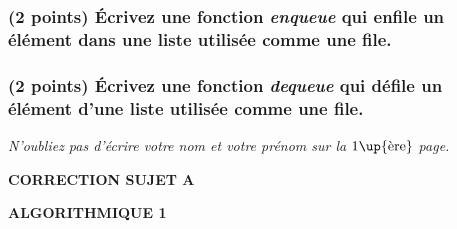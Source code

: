 \documentclass[11pt,a4paper]{article}
\newcommand{\TitreMatiere}{Algorithmique 1}
\begin{document}
\medskip

\subsubsection{(2 points) \'Ecrivez une fonction \og \textit{enqueue} \fg{} qui enfile un élément dans une liste utilisée comme une file. }

\begin{center}
\end{center}


\subsubsection{(2 points) \'Ecrivez une fonction \og \textit{dequeue} \fg{} qui défile un élément d'une liste utilisée comme une file. }

\begin{center}
\end{center}



\vfillFirst

\begin{center}
\textit{N'oubliez pas d'écrire votre nom et votre prénom sur la $1\up{\text{ère}}$ page.}
\end{center}

\vfillLast


\clearpage



\vfillFirst

\begin{center}

\begin{LARGE}
\textbf{CORRECTION SUJET A}

\bigskip

\textbf{\MakeUppercase{\TitreMatiere}}
\end{LARGE}

\end{center}

\vfillLast
\end{document}
